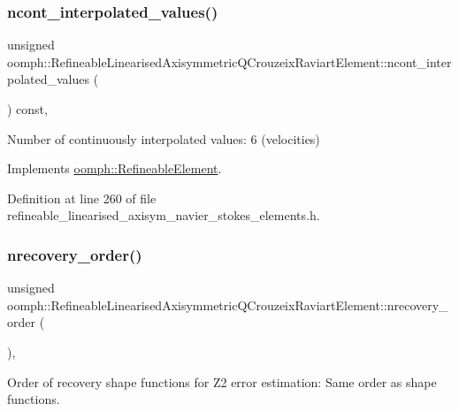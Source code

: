 \subsubsection{\texorpdfstring{ncont\+\_\+interpolated\+\_\+values()}{ncont\_interpolated\_values()}}
{\footnotesize\ttfamily unsigned oomph\+::\+Refineable\+Linearised\+Axisymmetric\+Q\+Crouzeix\+Raviart\+Element\+::ncont\+\_\+interpolated\+\_\+values (\begin{DoxyParamCaption}{ }\end{DoxyParamCaption}) const\hspace{0.3cm}{\ttfamily [inline]}, {\ttfamily [virtual]}}



Number of continuously interpolated values\+: 6 (velocities) 



Implements \hyperlink{classoomph_1_1RefineableElement_a53e171a18c9f43f1db90a6876516a073}{oomph\+::\+Refineable\+Element}.



Definition at line 260 of file refineable\+\_\+linearised\+\_\+axisym\+\_\+navier\+\_\+stokes\+\_\+elements.\+h.

\mbox{\label{classoomph_1_1RefineableLinearisedAxisymmetricQCrouzeixRaviartElement_ae56c7659e171cf0774b843d7db3ed270}} 
\subsubsection{\texorpdfstring{nrecovery\+\_\+order()}{nrecovery\_order()}}
{\footnotesize\ttfamily unsigned oomph\+::\+Refineable\+Linearised\+Axisymmetric\+Q\+Crouzeix\+Raviart\+Element\+::nrecovery\+\_\+order (\begin{DoxyParamCaption}{ }\end{DoxyParamCaption})\hspace{0.3cm}{\ttfamily [inline]}, {\ttfamily [virtual]}}



Order of recovery shape functions for Z2 error estimation\+: Same order as shape functions. 



